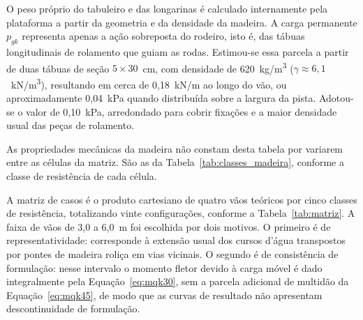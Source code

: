 \begin{table}[!ht]
\begin{threeparttable}
\begin{tablenotes}
\footnotesize
\item[a] O peso próprio do tabuleiro e das longarinas é calculado internamente pela plataforma a partir da geometria e da densidade da madeira. A carga permanente $p_{gk}$ representa apenas a ação sobreposta do rodeiro, isto é, das tábuas longitudinais de rolamento que guiam as rodas.
Estimou-se essa parcela a partir de duas tábuas de seção $5 \times 30$~cm, com densidade de 620~kg/m\textsuperscript{3} ($\gamma \approx 6{,}1$~kN/m\textsuperscript{3}), resultando em cerca de 0{,}18~kN/m ao longo do vão, ou aproximadamente 0{,}04~kPa quando distribuída sobre a largura da pista.
Adotou-se o valor de 0{,}10~kPa, arredondado para cobrir fixações e a maior densidade usual das peças de rolamento.
\item As propriedades mecânicas da madeira não constam desta tabela por variarem entre as células da matriz. São as da Tabela~\ref{tab:classes_madeira}, conforme a classe de resistência de cada célula.
\end{tablenotes}
\end{threeparttable}
\end{table}

A matriz de casos é o produto cartesiano de quatro vãos teóricos por cinco classes de resistência, totalizando vinte configurações, conforme a Tabela~\ref{tab:matriz}.
A faixa de vãos de 3{,}0 a 6{,}0~m foi escolhida por dois motivos.
O primeiro é de representatividade: corresponde à extensão usual dos cursos d'água transpostos por pontes de madeira roliça em vias vicinais.
O segundo é de consistência de formulação: nesse intervalo o momento fletor devido à carga móvel é dado integralmente pela Equação~\eqref{eq:mqk30}, sem a parcela adicional de multidão da Equação~\eqref{eq:mqk45}, de modo que as curvas de resultado não apresentam descontinuidade de formulação.

